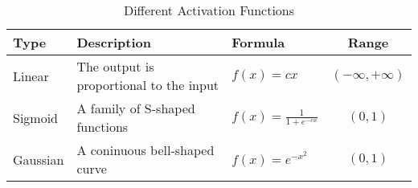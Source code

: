 \begin{table}
\centering
\caption{Different Activation Functions}
\begin{adjustbox}{width=0.9\textwidth}
	\begin{tabular}{lllc}
		\toprule
		Type & Description  & Formula & Range  \\
		\midrule
		Linear & The output is proportional to the input & $f(x)=cx$ &
		$(-\infty, +\infty)$ \\ 
		Sigmoid & A family of S-shaped functions& $f(x)=\frac{1}{1+e^{-cx}}$ &
		$(0, 1)$ \\ 
		Gaussian & A coninuous bell-shaped curve & $f(x)=e^{-x^2}$ & $(0,1)$ \\ 
		\bottomrule
	\end{tabular}
\end{adjustbox}
\end{table}
